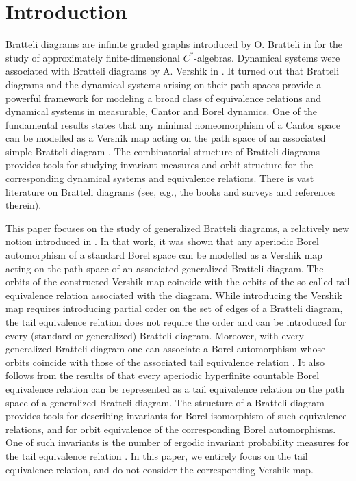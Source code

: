 \documentclass[11pt, twoside]{amsart}
\theoremstyle{definition}
\theoremstyle{remark}
\theoremstyle{plain}
\numberwithin{equation}{section}
\begin{document}
\section{Introduction}\label{intro}


Bratteli diagrams are infinite graded graphs introduced by O. Bratteli in \cite{Bratteli1972} for the study of approximately finite-dimensional $C^*$-algebras. Dynamical systems were associated with Bratteli diagrams by A. Vershik in \cite{Vershik_1981, Vershik_1982}. It turned out that Bratteli diagrams and the dynamical systems arising on their path spaces provide a powerful framework for modeling a broad class of equivalence relations and dynamical systems in measurable, Cantor and Borel dynamics. %
One of the fundamental results states that any minimal homeomorphism of a Cantor space can be modelled as a Vershik map acting on the path space of an associated simple  Bratteli diagram \cite{HermanPutnamSkau1992}. 
The combinatorial structure of Bratteli diagrams provides tools for studying invariant measures and orbit structure for the corresponding dynamical systems and equivalence relations. There is vast literature on Bratteli diagrams (see, e.g., the books and surveys \cite{Durand2010, BezuglyiKarpel2016, DownarowiczKarpel2018, Putnam2018, BezuglyiKarpel_2020, DurandPerrin2022} and references therein). 

This paper focuses on the study of generalized Bratteli diagrams, a relatively new notion introduced in \cite{BezuglyiDooleyKwiatkowski2006}. 
In that work, it was shown that any aperiodic Borel automorphism of a standard Borel space 
can be modelled as a Vershik map acting on the path space of an associated generalized Bratteli diagram. The orbits of the constructed Vershik map coincide with the orbits of the so-called tail equivalence relation associated with the diagram.
While introducing the Vershik map requires introducing partial order on the set of edges of a Bratteli diagram, the tail equivalence relation does not require the order and can be introduced for every (standard or generalized) Bratteli diagram.
Moreover, with every generalized Bratteli diagram one can associate a Borel automorphism whose orbits coincide with those of the associated tail equivalence relation \cite{Kechris2024}. 
It also follows from the results of \cite{BezuglyiDooleyKwiatkowski2006} that every aperiodic hyperfinite countable Borel equivalence relation can be represented as a tail equivalence relation on the path space of a generalized Bratteli diagram.
The structure of a Bratteli diagram provides tools for describing invariants for Borel isomorphism of such equivalence relations, and for orbit equivalence of the corresponding Borel automorphisms. One of such invariants is the number of  ergodic invariant probability measures for the tail equivalence relation
\cite{Dougherty_Jackson_Kechris1994, Kechris2024, BezuglyiKarpelKwiatkowski2019, BezuglyiKarpelKwiatkowskiWata2024}.
In this paper, we entirely focus on the tail equivalence relation, and do not consider the corresponding Vershik map. 
\end{document}
